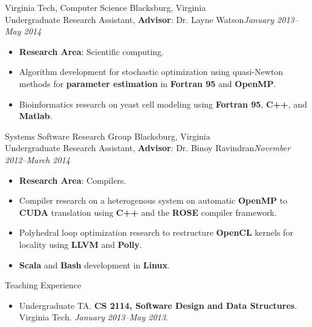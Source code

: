 \documentclass[letter]{article}
\begin{document}
\begin{minipage}{\textwidth}
\bigskip
{\large Virginia Tech, Computer Science } \hfill Blacksburg, Virginia \\
Undergraduate Research Assistant, {\bf Advisor}: Dr. Layne Watson\hfill {\it January 2013--May 2014}\begin{itemize}
  \item {\bf Research Area}: Scientific computing.
  \item Algorithm development for stochastic optimization using quasi-Newton methods for {\bf parameter estimation} in {\bf Fortran 95} and {\bf OpenMP}.
  \item Bioinformatics research on yeast cell modeling using {\bf Fortran 95}, {\bf C++}, and {\bf Matlab}.
\end{itemize}
\end{minipage}

\begin{minipage}{\textwidth}
\bigskip
{\large Systems Software Research Group } \hfill Blacksburg, Virginia \\
Undergraduate Research Assistant, {\bf Advisor}: Dr. Binoy Ravindran\hfill {\it November 2012--March 2014}
\begin{itemize}
  \item {\bf Research Area}: Compilers.
  \item Compiler research on a heterogenous system on automatic {\bf OpenMP} to {\bf CUDA} translation using {\bf C++} and the {\bf ROSE} compiler framework.
  \item Polyhedral loop optimization research to restructure {\bf OpenCL} kernels for locality using {\bf LLVM} and {\bf Polly}.
  \item {\bf Scala} and {\bf Bash} development in {\bf Linux}.
\end{itemize}
\end{minipage}

\begin{minipage}{\textwidth}
\bigskip
\end{minipage}\medskip

\begin{minipage}{\textwidth}
{\huge Teaching Experience }
  \begin{itemize}
      \item
        Undergraduate TA.
        {\bf CS 2114, Software Design and Data Structures}.
        Virginia Tech.
        {\it January 2013--May 2013}.
  \end{itemize}

\end{minipage}\medskip
\end{document}
